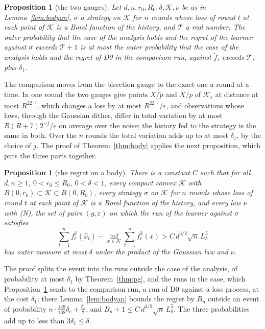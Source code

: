 \documentclass[11pt]{amsart}
\newtheorem{proposition}[theorem]{Proposition}
\theoremstyle{definition}
\numberwithin{equation}{section}
\newcommand{\cK}{\mathcal{K}}
\begin{document}
\begin{proposition}[the two gauges]\label{prop:gad}
Let $d,n,r_0,R_0,\delta,\cK,\nu$ be as in Lemma~\ref{lem:bodyan}, $\sigma$ a strategy on $\cK$ for $n$ rounds whose loss of round $t$ at each point of $\cK$ is a Borel function of the history, and $\mathcal T$ a real number. The outer probability that the case of the analysis holds and the regret of the learner against $\sigma$ exceeds $\mathcal T+1$ is at most the outer probability that the case of the analysis holds and the regret of D0 in the comparison run, against $\tilde f$, exceeds $\mathcal T$, plus $\delta_1$.
\end{proposition}

The comparison moves from the bisection gauge to the exact one a round at a time. In one round the two gauges give points $X/\tilde p$ and $X/p$ of $\cK_\varepsilon$ at distance at most $R^22^{-j}$, which changes a loss by at most $R^22^{-j}/\varepsilon$, and observations whose laws, through the Gaussian dither, differ in total variation by at most $R(R+7)2^{-j}/\varepsilon$ on average over the noise; the history fed to the strategy is the same in both. Over the $n$ rounds the total variation adds up to at most $\delta_1$, by the choice of $j$. The proof of Theorem~\ref{thm:body} applies the next proposition, which puts the three parts together.

\begin{proposition}[the regret on a body]\label{prop:regret}
There is a constant $C$ such that for all $d,n\ge1$, $0<r_0\le R_0$, $0<\delta<1$, every compact convex $\cK$ with $B(0,r_0)\subset\cK\subset B(0,R_0)$, every strategy $\sigma$ on $\cK$ for $n$ rounds whose loss of round $t$ at each point of $\cK$ is a Borel function of the history, and every law $\nu$ with (N), the set of pairs $(g,\varepsilon)$ on which the run of the learner against $\sigma$ satisfies
\[
\sum_{t=1}^nf^{\hat x}_t(\hat x_t)-\inf_{x\in\cK}\sum_{t=1}^nf^{\hat x}_t(x)>C\,d^{3/2}\sqrt n\,L_\delta^5
\]
has outer measure at most $\delta$ under the product of the Gaussian law and $\nu$.
\end{proposition}

The proof splits the event into the runs outside the case of the analysis, of probability at most $\delta_1$ by Theorem~\ref{thm:pg}, and the runs in the case, which Proposition~\ref{prop:gad} sends to the comparison run, a run of D0 against a loss process, at the cost $\delta_1$; there Lemma~\ref{lem:bodyan} bounds the regret by $B_n$ outside an event of probability $n\cdot\frac{149}{168}\delta_e+\frac{\delta_e}7$, and $B_n+1\le C\,d^{3/2}\sqrt n\,L_\delta^5$. The three probabilities add up to less than $3\delta_1\le\delta$.
\end{document}
